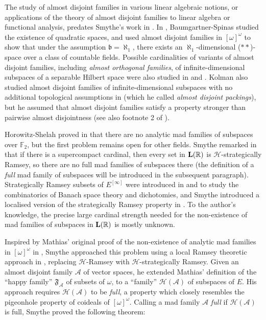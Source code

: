 \documentclass[11pt,reqno]{amsart}
\theoremstyle{plain}
\numberwithin{equation}{section}
\theoremstyle{definition}
\newcommand{\R}{\mathbb{R}}
\newcommand{\cal}{\mathcal}
\renewcommand{\frak}{\mathfrak}
\newcommand{\A}{\cal{A}}
\renewcommand{\H}{\cal{H}}
\let\strokeL\L
\DeclareRobustCommand{\L}{\ifmmode\mathbf{L}\else\strokeL\fi}
\begin{document}
The study of almost disjoint families in various linear algebraic notions, or applications of the theory of almost disjoint families to linear algebra or functional analysis, predates Smythe's work in \cite{S19}. In \cite{BS91}, Baumgartner-Spinas studied the existence of quadratic spaces, and used almost disjoint families in $[\omega]^\omega$ to show that under the assumption $\frak{b} = \aleph_1$, there exists an $\aleph_1$-dimensional ($**$)-space over a class of countable fields. Possible cardinalities of variants of almost disjoint families, including \emph{almost orthogonal families}, of infinite-dimensional subspaces of a separable Hilbert space were also studied in \cite{B11} and \cite{W08}. Kolman also studied almost disjoint families of infinite-dimensional subspaces with no additional topological assumptions in \cite{K00} (which he called \emph{almost disjoint packings}), but he assumed that almost disjoint families satisfy a property stronger than pairwise almost disjointness (see also footnote 2 of \cite{S19}).

Horowitz-Shelah proved in \cite{HS22} that there are no analytic mad families of subspaces over $\mathbb{F}_2$, but the first problem remains open for other fields. Smythe remarked in \cite{S19} that if there is a supercompact cardinal, then every set in $\L(\R)$ is $\H$-strategically Ramsey, so there are no full mad families of subspaces there (the definition of a \emph{full} mad family of subspaces will be introduced in the subsequent paragraph). Strategically Ramsey subsets of $E^{[\infty]}$ were introduced in \cite{R09} and \cite{R10} to study the combinatorics of Banach space theory and dichotomies, and Smythe introduced a localised version of the strategically Ramsey property in \cite{S18}. To the author's knowledge, the precise large cardinal strength needed for the non-existence of mad families of subspaces in $\L(\R)$ is mostly unknown.

Inspired by Mathias' original proof of the non-existence of analytic mad families in $[\omega]^\omega$ in \cite{M77}, Smythe approached this problem using a local Ramsey theoretic approach in \cite{S19}, replacing $\H$-Ramsey with $\H$-strategically Ramsey. Given an almost disjoint family $\A$ of vector spaces, he extended Mathias' definition of the ``happy family'' $\mathfrak{F}_\A$ of subsets of $\omega$, to a ``family'' $\H(\A)$ of subspaces of $E$. His approach requires $\H(\A)$ to be \emph{full}, a property which closely resembles the pigeonhole property of coideals of $[\omega]^\omega$. Calling a mad family $\A$ \emph{full} if $\H(\A)$ is full, Smythe proved the following theorem:
\end{document}
